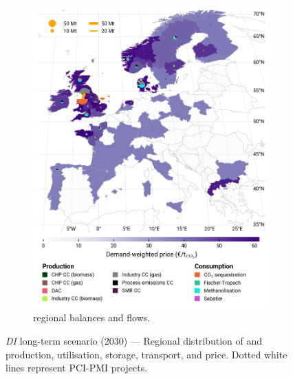 \documentclass[final,5p,times,twocolumn,sort&compress]{elsarticle}
\begin{document}
\begin{figure}[htbp]
\begin{subfigure}[t]{0.49\textwidth}
      \includegraphics[width=1\textwidth]{maps/no-pipelines-no-pcipmi/base_s_adm___2030-balance_map_co2_stored} 
      \vspace{-0.7cm}
      \caption{ regional balances and flows.}
      \label{fig:DI_lt_2030_co2}
  \end{subfigure}
  \caption{\textit{DI} long-term scenario (2030) --- Regional distribution of  and  production, utilisation, storage, transport, and price. Dotted white lines represent PCI-PMI projects.}
  \label{fig:DI_lt_2030}
\end{figure}
\end{document}
